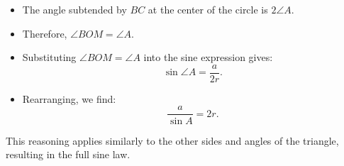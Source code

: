 \documentclass[a4paper,12pt]{article}
\begin{document}
\begin{itemize}
\item The angle subtended by \(BC\) at the center of the circle is \(2\angle A\).
\item Therefore, \(\angle BOM = \angle A\).
\end{itemize}

\begin{itemize}
\item Substituting \(\angle BOM = \angle A\) into the sine expression gives:
       \[
       \sin \angle A = \frac{a}{2r}.
       \]
\item Rearranging, we find:
       \[
       \frac{a}{\sin A} = 2r.
       \]
\end{itemize}

This reasoning applies similarly to the other sides and angles of the triangle, resulting in the full sine law.
\end{document}
